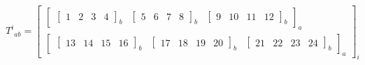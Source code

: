 \[
    T^i{}_{ab}=
    \left[\begin{array}{c}
            \left[\begin{array}{ccc}
                          \left[\begin{array}{NNNN}
                                  1 &
                                  2 &
                                  3 &
                                  4
                              \end{array}\right]_{b}
                           &
                          \left[\begin{array}{NNNN}
                                  5 &
                                  6 &
                                  7 &
                                  8
                              \end{array}\right]_{b}
                           &
                          \left[\begin{array}{NNNN}
                                  9  &
                                  10 &
                                  11 &
                                  12
                              \end{array}\right]_{b}
                      \end{array}\right]_{a}
            \\
            \left[\begin{array}{ccc}
                          \left[\begin{array}{NNNN}
                                  13 &
                                  14 &
                                  15 &
                                  16
                              \end{array}\right]_{b}
                           &
                          \left[\begin{array}{NNNN}
                                  17 &
                                  18 &
                                  19 &
                                  20
                              \end{array}\right]_{b}
                           &
                          \left[\begin{array}{NNNN}
                                  21 &
                                  22 &
                                  23 &
                                  24
                              \end{array}\right]_{b}
                      \end{array}\right]_{a}
        \end{array}\right]_{i}
\]
